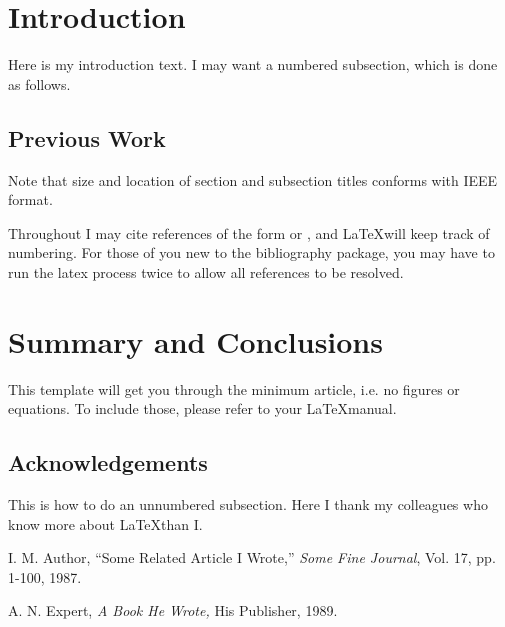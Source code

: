 \section{Introduction}

Here is my introduction text.  I may want a numbered subsection, which is
done as follows.

\subsection{Previous Work}

Note that size and location of section and subsection titles conforms with
IEEE format.

Throughout I may cite references of the form \cite{key:foo} or
\cite{foo:baz}, and \LaTeX will keep track of numbering.  For those of you
new to the bibliography package, you may have to run the latex process twice
to allow all references to be resolved.

\section{Summary and Conclusions}

This template will get you through the minimum article, i.e. no figures or
equations.  To include those, please refer to your \LaTeX manual.

\subsection*{Acknowledgements}

This is how to do an unnumbered subsection.  Here I thank my colleagues who
know more about \LaTeX than I.

\begin{thebibliography}{9}

I. M. Author, 
``Some Related Article I Wrote,''
{\it Some Fine Journal}, Vol. 17, pp. 1-100, 1987.

A. N. Expert, 
{\em A Book He Wrote,}
His Publisher, 1989.

\end{thebibliography}


